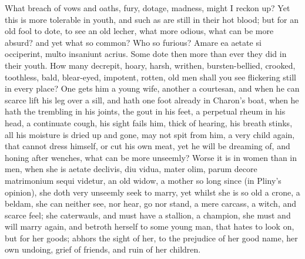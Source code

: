 {What breach of vows and oaths, fury, dotage, madness, might I reckon
up? Yet this is more tolerable in youth, and such as are still in their
hot blood; but for an old fool to dote, to see an old lecher, what more
odious, what can be more absurd? and yet what so common? Who so
furious? Amare ea aetate si occiperint, multo insaniunt acrius.
Some dote then more than ever they did in their youth. How many
decrepit, hoary, harsh, writhen, bursten-bellied, crooked, toothless,
bald, blear-eyed, impotent, rotten, old men shall you see flickering
still in every place? One gets him a young wife, another a courtesan,
and when he can scarce lift his leg over a sill, and hath one foot
already in Charon's boat, when he hath the trembling in his joints, the
gout in his feet, a perpetual rheum in his head, a continuate cough,
his sight fails him, thick of hearing, his breath stinks, all his
moisture is dried up and gone, may not spit from him, a very child
again, that cannot dress himself, or cut his own meat, yet he will be
dreaming of, and honing after wenches, what can be more unseemly? Worse
it is in women than in men, when she is aetate declivis, diu vidua,
mater olim, parum decore matrimonium sequi videtur, an old widow, a
mother so long since (in Pliny's opinion), she doth very unseemly
seek to marry, yet whilst she is so old a crone, a beldam, she
can neither see, nor hear, go nor stand, a mere carcass, a witch,
and scarce feel; she caterwauls, and must have a stallion, a champion,
she must and will marry again, and betroth herself to some young man,
that hates to look on, but for her goods; abhors the sight of
her, to the prejudice of her good name, her own undoing, grief of
friends, and ruin of her children.

}
